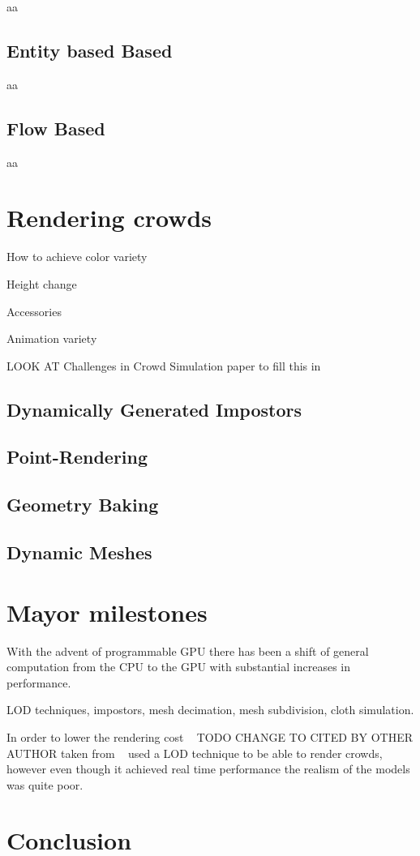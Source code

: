 \documentclass[11pt,twocolumn]{article}
\numberwithin{equation}{section} %
\numberwithin{figure}{section} %
\numberwithin{table}{section} %
\begin{document}
aa

\subsection{Entity based Based}

aa

\subsection{Flow Based}

aa

\section{Rendering crowds}

How to achieve color variety

Height change

Accessories 

Animation variety

LOOK AT Challenges in Crowd Simulation paper to fill this in

\subsection{Dynamically Generated Impostors}
\subsection{Point-Rendering}
\subsection{Geometry Baking}
\subsection{Dynamic Meshes}

\section{Mayor milestones}

With the advent of programmable GPU there has been a shift of general computation from the CPU to the GPU with substantial increases in performance.

LOD techniques, impostors, mesh decimation, mesh subdivision, cloth simulation.

In order to lower the rendering cost ~\cite{pratt1997humans} TODO CHANGE TO CITED BY OTHER AUTHOR taken from ~\cite{Aubel1999} used a LOD technique to be able to render crowds, however even though it  achieved real time performance the realism of the models was quite poor.



\section{Conclusion}

%


\end{document}
